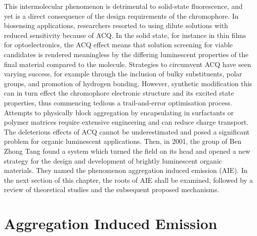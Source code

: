 This intermolecular phenomenon is detrimental to solid-state fluorescence, and yet is a direct consequence of the design requirements of the chromophore. In biosensing applications, researchers resorted to using dilute solutions with reduced sensitivity because of ACQ.\cite{Thomas2007,Kwok2015} In the solid state, for instance in thin films for optoelectronics, the ACQ effect means that solution screening for viable candidates is rendered meaningless by the differing luminescent properties of the final material compared to the molecule. Strategies to circumvent ACQ have seen varying success, for example through the inclusion of bulky substituents, polar groups, and promotion of hydrogen bonding.\cite{Hong2009,Zhang2013,Mei2014,Mei2015} However, synthetic modification this can in turn effect the chromophore electronic structure and its excited state properties, thus commencing tedious a trail-and-error optimisation process. Attempts to physically block aggregation by encapsulating in surfactants or polymer matrices require extensive engineering and can reduce charge transport.\cite{Hong2009,Chen2000,Lee2013} The deleterious effects of ACQ cannot be underestimated and posed a significant problem for organic luminescent applications. Then, in 2001, the group of Ben Zhong Tang found a system which turned the field on its head and opened a new strategy for the design and development of brightly luminescent organic materials. They named the phenomenon aggregation induced emission (AIE). In the next section of this chapter, the roots of AIE shall be examined, followed by a review of theoretical studies and the subsequent proposed mechanisms.
\section{Aggregation Induced Emission}\label{section: lom AIE}


